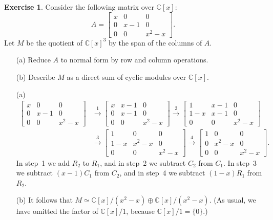 \documentclass{amsart}
\newcommand{\bbm}       {\left[\begin{matrix}}
\newcommand{\ebm}       {\end{matrix}\right]}
\newcommand{\C}         {{\mathbb{C}}}
\newcommand{\xra}       {\xrightarrow}
\newcommand{\ip}[1]     {\langle #1\rangle}
\newcommand{\op}        {\oplus}
\renewcommand{\:}{\colon}
\theoremstyle{definition}
\newtheorem{exercise}{Exercise}[section]
\renewenvironment{solution}{\SolutionAtEnd}{\endSolutionAtEnd}
\begin{document}
\begin{exercise}
 Consider the following matrix over $\C[x]$:
 \[ A = \bbm x & 0 & 0 \\ 0 & x-1 & 0 \\ 0 & 0 & x^2-x \ebm. \]
 Let $M$ be the quotient of $\C[x]^3$ by the span of the columns of
 $A$. 
 \begin{itemize}
  \item[(a)] Reduce $A$ to normal form by row and column operations.
  \item[(b)] Describe $M$ as a direct sum of cyclic modules over
   $\C[x]$. 
 \end{itemize}
\end{exercise}
\begin{solution}
 \begin{itemize}
  \item[(a)] 
   \begin{align*}
             \bbm x & 0 & 0 \\ 0 & x-1 & 0 \\ 0 & 0 & x^2-x \ebm
    &\xra{1} \bbm x & x-1 & 0 \\ 0 & x-1 & 0 \\ 0 & 0 & x^2-x \ebm
     \xra{2} \bbm 1 & x-1 & 0 \\ 1-x & x-1 & 0 \\ 0 & 0 & x^2-x \ebm\\
    &\xra{3} \bbm 1 & 0 & 0 \\ 1-x & x^2-x & 0 \\ 0 & 0 & x^2-x \ebm
     \xra{4} \bbm 1 & 0 & 0 \\ 0 & x^2-x & 0 \\ 0 & 0 & x^2-x \ebm.
   \end{align*}
   In step~1 we add $R_2$ to $R_1$, and in step~2 we subtract $C_2$
   from $C_1$.  In step~3 we subtract $(x-1)C_1$ from $C_2$, and in
   step~4 we subtract $(1-x)R_1$ from $R_2$.
  \item[(b)]
   It follows that $M\simeq\C[x]/(x^2-x)\op\C[x]/(x^2-x)$.  (As usual,
   we have omitted the factor of $\C[x]/1$, because $\C[x]/1=\{0\}$.)
 \end{itemize}
\end{solution}
\end{document}
